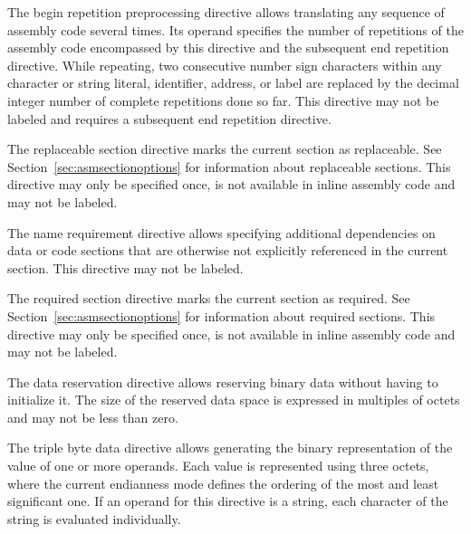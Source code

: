 
The begin repetition preprocessing directive allows translating any sequence of assembly code several times.
Its operand specifies the number of repetitions of the assembly code encompassed by this directive and the subsequent end repetition directive.
While repeating, two consecutive number sign characters within any character or string literal, identifier, address, or label are replaced by the decimal integer number of complete repetitions done so far.
This directive may not be labeled and requires a subsequent end repetition directive.


The replaceable section directive marks the current section as replaceable.
See Section~\ref{sec:asmsectionoptions} for information about replaceable sections.
This directive may only be specified once, is not available in inline assembly code and may not be labeled.


The name requirement directive allows specifying additional dependencies on data or code sections that are otherwise not explicitly referenced in the current section.
This directive may not be labeled.


The required section directive marks the current section as required.
See Section~\ref{sec:asmsectionoptions} for information about required sections.
This directive may only be specified once, is not available in inline assembly code and may not be labeled.


The data reservation directive allows reserving binary data without having to initialize it.
The size of the reserved data space is expressed in multiples of octets and may not be less than zero.


The triple byte data directive allows generating the binary representation of the value of one or more operands.
Each value is represented using three octets, where the current endianness mode defines the ordering of the most and least significant one.
If an operand for this directive is a string, each character of the string is evaluated individually.

